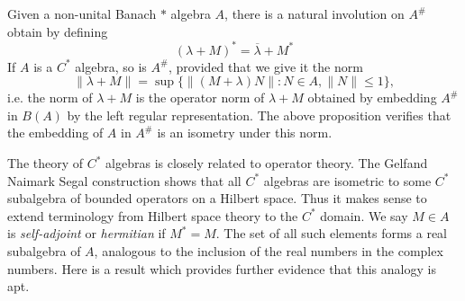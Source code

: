 Given a non-unital Banach $*$ algebra $A$, there is a natural involution on $A^\#$ obtain by defining
%
\[ (\lambda + M)^* = \overline{\lambda} + M^* \]
%
If $A$ is a $C^*$ algebra, so is $A^\#$, provided that we give it the norm
%
\[ \| \lambda + M \| = \sup \{ \| (M + \lambda) N \| : N \in A, \| N \| \leq 1 \}, \]
%
i.e. the norm of $\lambda + M$ is the operator norm of $\lambda + M$ obtained by embedding $A^\#$ in $B(A)$ by the left regular representation. 
%
%
%
%
%
%
%
%
%
%
%
%
%
The above proposition verifies that the embedding of $A$ in $A^\#$ is an isometry under this norm.

The theory of $C^*$ algebras is closely related to operator theory. The Gelfand Naimark Segal construction shows that all $C^*$ algebras are isometric to some $C^*$ subalgebra of bounded operators on a Hilbert space. Thus it makes sense to extend terminology from Hilbert space theory to the $C^*$ domain. We say $M \in A$ is \emph{self-adjoint} or \emph{hermitian} if $M^* = M$. The set of all such elements forms a real subalgebra of $A$, analogous to the inclusion of the real numbers in the complex numbers. Here is a result which provides further evidence that this analogy is apt.

